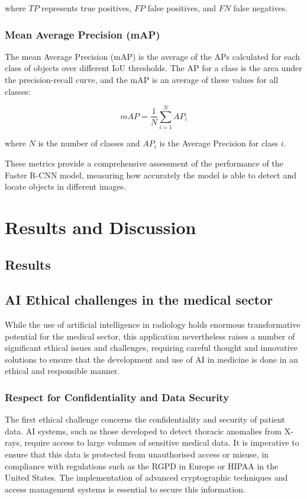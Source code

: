 \documentclass[12pt,oneside]{book} %
\begin{document}
where $TP$ represents true positives, $FP$ false positives, and $FN$ false
negatives.

\subsection{Mean Average Precision (mAP)}

The mean Average Precision (mAP) is the average of the APs calculated for each
class of objects over different IoU thresholds. The AP for a class is the area
under the precision-recall curve, and the mAP is an average of these values for
all classes:

\begin{equation}
    mAP = \frac{1}{N} \sum_{i=1}^{N} AP_i
\end{equation}

where $N$ is the number of classes and $AP_i$ is the Average Precision for
class $i$.

These metrics provide a comprehensive assessment of the performance of the
Faster R-CNN model, measuring how accurately the model is able to detect and
locate objects in different images.

\chapter{Results and Discussion}
\section{Results}

\section{AI Ethical challenges in the medical sector}

While the use of artificial intelligence in radiology holds enormous
transformative potential for the medical sector, this application nevertheless
raises a number of significant ethical issues and challenges, requiring careful
thought and innovative solutions to ensure that the development and use of AI
in medicine is done in an ethical and responsible manner.

\subsection{Respect for Confidentiality and Data Security}

The first ethical challenge concerns the confidentiality and security of
patient data. AI systems, such as those developed to detect thoracic anomalies
from X-rays, require access to large volumes of sensitive medical data. It is
imperative to ensure that this data is protected from unauthorised access or
misuse, in compliance with regulations such as the RGPD in Europe or HIPAA in
the United States. The implementation of advanced cryptographic techniques and
access management systems is essential to secure this information.
\end{document}
